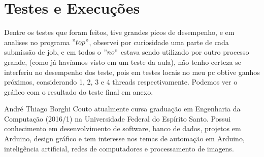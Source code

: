 \documentclass[10pt,journal,compsoc]{IEEEtran}
\begin{document}
\section{Testes e Execuções}
Dentre os testes que foram feitos, tive grandes picos de desempenho, e em analises no programa $"top"$, observei por curiosidade uma parte de cada submissão de job, e em todos o $"no"$ estava sendo utilizado por outro processo grande, (como já havíamos visto em um teste da aula), não tenho certeza se interferiu no desempenho dos teste, pois em testes locais no meu pc obtive ganhos próximos, considerando 1, 2, 3 e 4 threads respectivamente.
Podemos ver o gráfico com o resultado do teste final em anexo. %




\begin{IEEEbiographynophoto}{André Thiago Borghi Couto}
atualmente cursa graduação em Engenharia da Computação (2016/1) na Universidade Federal do Espírito Santo. Possui conhecimento em desenvolvimento de software, banco de dados, projetos em Arduino, design gráfico e tem interesse nos temas de automação em Arduino, inteligência artificial, redes de computadores e processamento de imagens.
\end{IEEEbiographynophoto}
\end{document}
